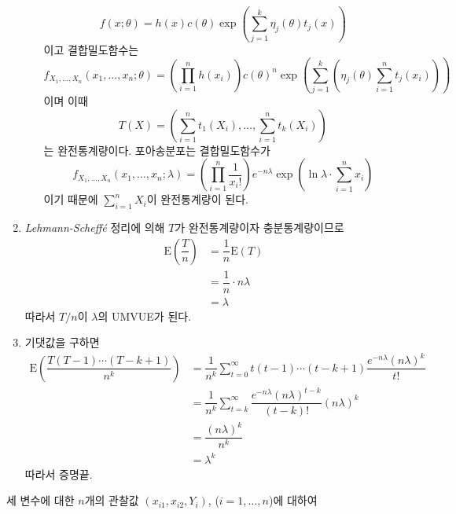 \documentclass[answers]{exam}
\begin{document}
\begin{questions}
\begin{solution}
\begin{enumerate}
\begin{itemize}
        $$
          f\left(x;\theta\right) = h\left(x\right)c\left(\theta\right)\exp\left(\sum_{j=1}^{k}\eta_{j}\left(\theta\right)t_{j}\left(x\right)\right)
        $$
        이고 결합밀도함수는
        $$
          f_{X_{1},\ldots,X_{n}}\left(x_{1},\ldots,x_{n};\theta\right)= \left(\prod_{i=1}^{n}h\left(x_{i}\right)\right)c\left(\theta\right)^{n}\exp\left(\sum_{j=1}^{k}\left(\eta_{j}\left(\theta\right)\sum_{i=1}^{n}t_{j}\left(x_{i}\right)\right)\right)
        $$
        이며 이때
        $$
          T\left(X\right)=\left(\sum_{i=1}^{n}t_{1}\left(X_{i}\right),\ldots,\sum_{i=1}^{n}t_{k}\left(X_{i}\right)\right)
        $$
        는 완전통계량이다. 포아송분포는 결합밀도함수가
        \begin{equation}
          f_{X_{1},\ldots,X_{n}}\left(x_{1},\ldots,x_{n};\lambda\right) = \left(\prod_{i=1}^{n}\dfrac{1}{x_{i}!}\right)e^{-n\lambda}\exp\left(\ln \lambda \cdot \sum_{i=1}^{n}x_{i}\right)
        \end{equation}
        이기 때문에 $\sum_{i=1}^{n}X_{i}$이 완전통계량이 된다.
      \end{itemize}
      \item \emph{Lehmann-Scheffé} 정리에 의해 $T$가 완전통계량이자 충분통계량이므로
      \begin{align}
        \mathrm{E}\left(\dfrac{T}{n}\right) &= \dfrac{1}{n}\mathrm{E}\left(T\right)\\
        &= \dfrac{1}{n}\cdot n\lambda\\
        &= \lambda
      \end{align}
      따라서 $T/n$이 $\lambda$의 UMVUE가 된다.
      \item 기댓값을 구하면
      \begin{align}
        \mathrm{E}\left(\dfrac{T\left(T-1\right)\cdots\left(T-k+1\right)}{n^{k}}\right) &= \dfrac{1}{n^{k}}\sum_{t=0}^{\infty}t\left(t-1\right)\cdots \left(t-k+1\right)\dfrac{e^{-n\lambda}\left(n\lambda\right)^{k}}{t!}\\
        &= \dfrac{1}{n^{k}}\sum_{t=k}^{\infty}\dfrac{e^{-n\lambda}\left(n\lambda\right)^{t-k}}{\left(t-k\right)!}\left(n\lambda\right)^{k}\\
        &=\dfrac{\left(n\lambda\right)^{k}}{n^{k}}\\
        &=\lambda^{k}
      \end{align}
      따라서 증명끝.
    \end{enumerate}
   \end{solution}
   \question
   세 변수에 대한 $n$개의 관찰값 $\left(x_{i1},x_{i2},Y_{i}\right)$, ($i=1,\ldots,n$)에 대하여

\end{questions}
\end{document}
